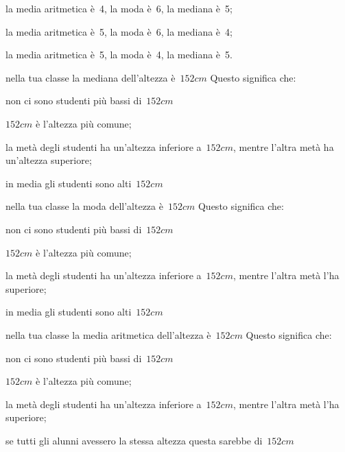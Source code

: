 \begin{esercizio}
\begin{enumerate*}
\begin{enumeratea}
\item la media aritmetica è~4, la moda è~6, la mediana è~5;
\item la media aritmetica è~5, la moda è~6, la mediana è~4;
\item la media aritmetica è~5, la moda è~4, la mediana è~5.
 \end{enumeratea}
\item nella tua classe la mediana dell'altezza è~$152\unit{cm}$ Questo 
significa che:
 \begin{enumeratea}
\item non ci sono studenti più bassi di~$152\unit{cm}$
\item $152\unit{cm}$ è l'altezza più comune;
\item la metà degli studenti ha un'altezza inferiore a~$152\unit{cm}$, 
mentre l'altra metà ha un'altezza superiore;
\item in media gli studenti sono alti~$152\unit{cm}$
 \end{enumeratea}
\item nella tua classe la moda dell'altezza è~$152\unit{cm}$ Questo 
significa che:
 \begin{enumeratea}
\item non ci sono studenti più bassi di~$152\unit{cm}$
\item $152\unit{cm}$ è l'altezza più comune;
\item la metà degli studenti ha un'altezza inferiore a~$152\unit{cm}$, 
mentre l'altra metà l'ha superiore;
\item in media gli studenti sono alti~$152\unit{cm}$
 \end{enumeratea}
\item nella tua classe la media aritmetica dell'altezza è~$152\unit{cm}$ 
Questo significa che:
 \begin{enumeratea}
\item non ci sono studenti più bassi di~$152\unit{cm}$
\item $152\unit{cm}$ è l'altezza più comune;
\item la metà degli studenti ha un'altezza inferiore a~$152\unit{cm}$, 
mentre l'altra metà l'ha superiore;
\item se tutti gli alunni avessero la stessa altezza questa sarebbe 
di~$152\unit{cm}$
 \end{enumeratea}
\end{enumerate*}
\end{esercizio}

